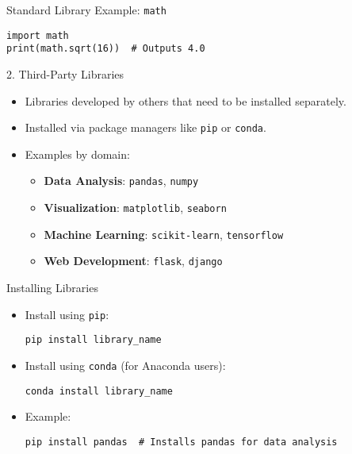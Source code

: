 \documentclass[serif, aspectratio=169]{beamer}
\begin{document}
\begin{frame}[fragile]{Standard Library Example: \texttt{math}}
    \begin{lstlisting}
import math
print(math.sqrt(16))  # Outputs 4.0
    \end{lstlisting}
\end{frame}

\begin{frame}{2. Third-Party Libraries}
    \begin{itemize}
        \item Libraries developed by others that need to be installed separately.
        \item Installed via package managers like \texttt{pip} or \texttt{conda}.
        \item Examples by domain:
        \begin{itemize}
            \item \textbf{Data Analysis}: \texttt{pandas}, \texttt{numpy}
            \item \textbf{Visualization}: \texttt{matplotlib}, \texttt{seaborn}
            \item \textbf{Machine Learning}: \texttt{scikit-learn}, \texttt{tensorflow}
            \item \textbf{Web Development}: \texttt{flask}, \texttt{django}
        \end{itemize}
    \end{itemize}
\end{frame}

\begin{frame}[fragile]{Installing Libraries}
    \begin{itemize}
        \item Install using \texttt{pip}:
        \begin{lstlisting}
pip install library_name
        \end{lstlisting}
        \item Install using \texttt{conda} (for Anaconda users):
        \begin{lstlisting}
conda install library_name
        \end{lstlisting}
        \item Example:
        \begin{lstlisting}
pip install pandas  # Installs pandas for data analysis
        \end{lstlisting}
    \end{itemize}
\end{frame}
\end{document}
